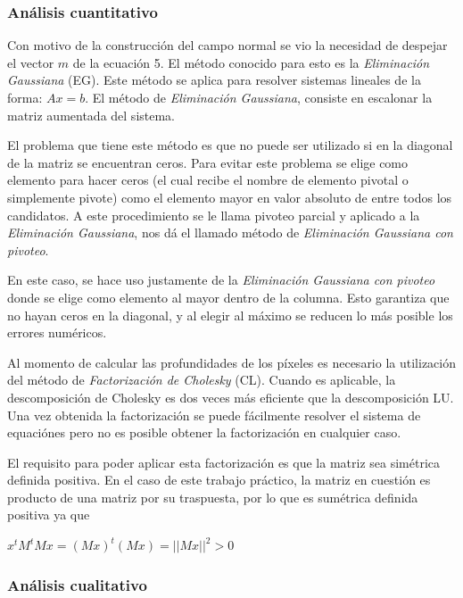 \subsubsection{Análisis cuantitativo}

Con motivo de la construcción del campo normal se vio la necesidad de despejar el vector $m$ de la ecuación 5. El método conocido para esto es la \textit{Eliminación Gaussiana} (EG). Este método se aplica para resolver sistemas lineales de la forma: $Ax = b$. El método de \textit{Eliminación Gaussiana}, consiste en escalonar la matriz aumentada del sistema.

El problema que tiene este método es que no puede ser utilizado si en la diagonal de la matriz se encuentran ceros. Para evitar este problema se elige como elemento para hacer ceros (el cual recibe el nombre de elemento pivotal o simplemente pivote) como el elemento mayor en valor absoluto de entre todos los candidatos. A este procedimiento se le llama pivoteo parcial y aplicado a la \textit{Eliminación Gaussiana}, nos dá el llamado método de \textit{Eliminación Gaussiana con pivoteo}.

En este caso, se hace uso justamente de la \textit{Eliminación Gaussiana con pivoteo} donde se elige como elemento al mayor dentro de la columna. Esto garantiza que no hayan ceros en la diagonal, y al elegir al máximo se reducen lo más posible los errores numéricos.

Al momento de calcular las profundidades de los píxeles es necesario la utilización del método de \textit{Factorización de Cholesky} (CL). Cuando es aplicable, la descomposición de Cholesky es dos veces más eficiente que la descomposición LU. Una vez obtenida la factorización se puede fácilmente resolver el sistema de equaciónes pero no es posible obtener la factorización en cualquier caso.

El requisito para poder aplicar esta factorización es que la matriz sea simétrica definida positiva. En el caso de este trabajo práctico, la matriz en cuestión es producto de una matriz por su traspuesta, por lo que es sumétrica definida positiva ya que

\begin{center}
$x^tM^tMx = (Mx)^t(Mx) = ||Mx||^2 > 0$
\end{center}

\subsubsection{Análisis cualitativo}

